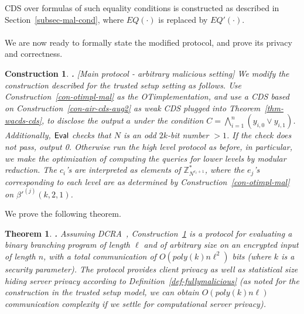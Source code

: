 \documentclass[11pt]{article}
\newtheorem{THEOREM}{Theorem}[section]
\newenvironment{theorem}{\begin{THEOREM} \hspace{-.85em} {\bf .} \rm}%
	{\end{THEOREM}}
\newtheorem{CONSTRUCTION}{Construction}[section]
\newenvironment{construction}{\begin{CONSTRUCTION} \hspace{-.85em} {\bf .} \rm}%
	{\end{CONSTRUCTION}}
\newcommand{\eval}{{\sf Eval}}
\newcommand{\ot}{\mbox{OT}\;}
\newcommand{\U}[1]{\mathbb{Z}_{#1}^*}
\begin{document}
CDS over formulas of such equality conditions is constructed as described in Section~\ref{subsec-mal-cond},
where $EQ(\cdot)$ is replaced by $EQ'(\cdot)$.
\paragraph{}We are now ready to formally state the modified protocol, and prove its privacy and correctness.
\begin{construction}[Main protocol - arbitrary malicious setting]
  \label{con-main-fullymal}
  We modify the construction described for the trusted setup setting as follows.
  Use Construction~\ref{con-otimpl-mal} as the \ot implementation,
  and use a CDS based on Construction~\ref{con-air-cds-aug2} as weak CDS plugged into Theorem~\ref{thm-wacds-cds}, to disclose the output $a$ under the condition $C=\bigwedge^n_{i=1}(y_{i,0}\vee y_{i,1})$.
  Additionally, $\eval$ checks that $N$ is an odd $2k$-bit number $>1$. If the check does not pass, output 0. Otherwise run the high level protocol as before, in particular, we make the optimization of computing the queries for lower levels by modular reduction. The $c_i$'s are interpreted as elements of $\U{N^{e_{\ell}+1}}$, where the $e_j$'s corresponding to each level are as determined by Construction~\ref{con-otimpl-mal} on $\beta'^{(j)}(k,2,1)$.
\end{construction}
We prove the following theorem.
\begin{theorem}
  Assuming DCRA~\cite{DJ01}, Construction~\ref{con-main-fullymal} is a protocol for evaluating a
  binary branching program of length $\ell$ and of arbitrary size on
  an encrypted input of length $n$, with a total communication of
  $O(poly(k)n\ell^2)$ bits (where $k$ is a security parameter). The protocol
  provides client privacy as well as statistical size hiding server privacy
  according to Definition~\ref{def-fullymalicious} (as noted for the construction in the trusted setup model, we can obtain $O(poly(k)n\ell)$ communication complexity if we settle for computational server privacy).
\end{theorem}
\end{document}
